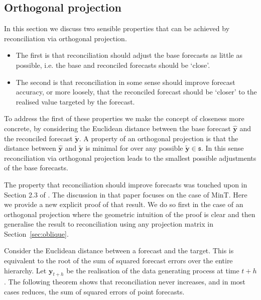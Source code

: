 \documentclass[12pt]{article}
\theoremstyle{definition}
\theoremstyle{property}
\begin{document}
	\subsection{Orthogonal projection}\label{sec:orthogonal}
	
	In this section we discuss two sensible properties that can be achieved by reconciliation via orthogonal projection.
\begin{itemize}
  \item The  first is that reconciliation should adjust the base forecasts as little as possible, i.e. the base and reconciled forecasts should be `close'.
  \item The second is that reconciliation in some sense should improve forecast accuracy, or more loosely, that the reconciled forecast should be `closer' to the realised value targeted by the forecast.
\end{itemize}

	
	To address the first of these properties we make the concept of closeness more concrete, by considering the Euclidean distance between the base forecast $\hat{\bm{y}}$ and the reconciled forecast  $\tilde{\bm{y}}$.  A property of an orthogonal projection is that the distance between $\hat{\bm{y}}$ and $\tilde{\bm{y}}$ is minimal for over any possible $\tilde{\bm{y}}\in\mathfrak{s}$.  In this sense reconciliation via orthogonal projection leads to the smallest possible adjustments of the base forecasts.
	
	The property that reconciliation should improve forecasts was touched upon in Section 2.3 of \cite{WicEtAl2019}.  The discussion in that paper focuses on the case of MinT. Here we provide a new explicit proof of that result.  We do so first in the case of an orthogonal projection where the geometric intuition of the proof is clear and then generalise the result to reconciliation using any projection matrix in Section~\ref{sec:oblique}.
		
	Consider the Euclidean distance between a forecast and the target. This is equivalent to the root of the sum of squared forecast errors over the entire hierarchy. Let $\bm{y}_{t+h}$ be the realisation of the data generating process at time $t+h$. The following theorem shows that reconciliation never increases, and in most cases reduces, the sum of squared errors of point forecasts.
	
\end{document}
